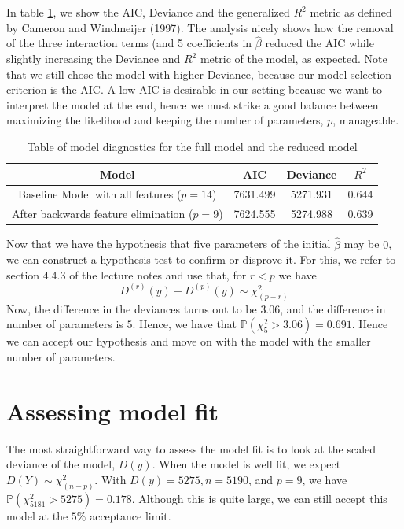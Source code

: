 \documentclass[a4paper,11pt]{article}
\begin{document}
In table \ref{tab:backwards_elimination}, we show the AIC, Deviance and the generalized $R^2$ metric as defined by Cameron and Windmeijer (1997). The analysis nicely shows how the removal of the three interaction terms (and 5 coefficients in $\hat{\beta}$ reduced the AIC while slightly increasing the Deviance and $R^2$ metric of the model, as expected. Note that we still chose the model with higher Deviance, because our model selection criterion is the AIC. A low AIC is desirable in our setting because we want to interpret the model at the end, hence we must strike a good balance between maximizing the likelihood and keeping the number of parameters, $p$, manageable.

\begin{table}[h]
    \centering
    \begin{tabular}{|c|c|c|c|}
    \hline
    Model & AIC & Deviance & $R^2$\\
    \hline
    Baseline Model with all features ($p=14$) &  7631.499 & 5271.931 & 0.644\\
    After backwards feature elimination ($p=9$) & 7624.555 & 5274.988  & 0.639\\
        \hline
        
    \end{tabular}
    \caption{Table of model diagnostics for the full model and the reduced model}
    \label{tab:backwards_elimination}
\end{table}

Now that we have the hypothesis that five parameters of the initial $\hat{\beta}$ may be $0$, we can construct a hypothesis test to confirm or disprove it. For this, we refer to section 4.4.3 of the lecture notes and use that, for $r<p$ we have
\begin{equation}
D^{(r)}(y) - D^{(p)}(y) \sim \chi^2_{(p-r)}
\end{equation}
Now, the difference in the deviances turns out to be $3.06$, and the difference in number of parameters is $5$. Hence, we have that $\mathbb{P}( \chi^2_{5} > 3.06) = 0.691$. Hence we can accept our hypothesis and move on with the model with the smaller number of parameters.

\section{Assessing model fit}
The most straightforward way to assess the model fit is to look at the scaled deviance of the model, $D(y)$. When the model is well fit, we expect $D(Y) \sim \chi^2_{(n-p)}$. With $D(y) = 5275, n = 5190$, and $p=9$, we have $\mathbb{P}( \chi^2_{5181} > 5275) = 0.178$. Although this is quite large, we can still accept this model at the $5\%$ acceptance limit.
\end{document}
